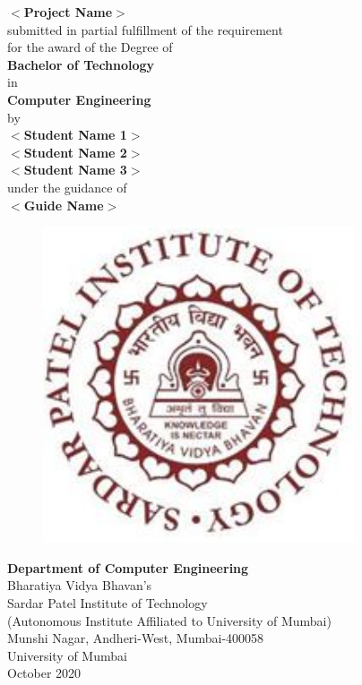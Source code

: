 \begin{titlepage}
\vspace*{0.25cm}
{\centering
\large
{\Large\textbf {$<$Project Name$>$}}\\
\vspace{0.75cm}
submitted in partial fulfillment of the requirement\\
for the award of the Degree of\\\vspace{1cm}
{\large\textbf {Bachelor of Technology}}\\
in \\
{\large\textbf {Computer Engineering}}\\
\vspace{0.75cm}
by\\
\vspace{0.75cm}
{\large \textbf {$<$Student Name 1$>$}}\\
{\large \textbf {$<$Student Name 2$>$}}\\
{\large \textbf {$<$Student Name 3$>$}}\\
\vspace{0.75cm} 
under the guidance of\\ 
\vspace{0.75cm}
\hspace{.05cm} {\large \textbf {$<$Guide Name$>$}}\\
\begin{figure}[h]
\centering
\includegraphics[scale=0.8]{spitlogo.pdf}
\end{figure}
\hspace{.05cm}
\hspace{.05cm}
\textbf {Department of Computer Engineering}\\
Bharatiya  Vidya Bhavan's\\
Sardar Patel Institute of Technology\\
(Autonomous Institute Affiliated to University of Mumbai)\\
Munshi Nagar, Andheri-West, Mumbai-400058\\
University of Mumbai\\
\hspace{6.25cm}October 2020}\\
\end{titlepage}
\newpage

